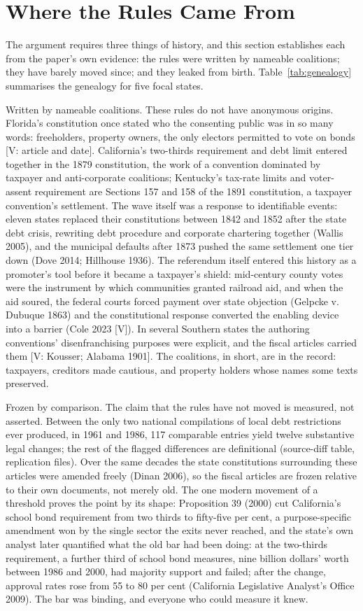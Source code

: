 \section{Where the Rules Came From}
The argument requires three things of history, and this section establishes each from the paper's own evidence: the rules were written by nameable coalitions; they have barely moved since; and they leaked from birth. Table~\ref{tab:genealogy} summarises the genealogy for five focal states.

Written by nameable coalitions. These rules do not have anonymous origins. Florida's constitution once stated who the consenting public was in so many words: freeholders, property owners, the only electors permitted to vote on bonds [V: article and date]. California's two-thirds requirement and debt limit entered together in the 1879 constitution, the work of a convention dominated by taxpayer and anti-corporate coalitions; Kentucky's tax-rate limits and voter-assent requirement are Sections 157 and 158 of the 1891 constitution, a taxpayer convention's settlement. The wave itself was a response to identifiable events: eleven states replaced their constitutions between 1842 and 1852 after the state debt crisis, rewriting debt procedure and corporate chartering together (Wallis 2005), and the municipal defaults after 1873 pushed the same settlement one tier down (Dove 2014; Hillhouse 1936). The referendum itself entered this history as a promoter's tool before it became a taxpayer's shield: mid-century county votes were the instrument by which communities granted railroad aid, and when the aid soured, the federal courts forced payment over state objection (Gelpcke v. Dubuque 1863) and the constitutional response converted the enabling device into a barrier (Cole 2023 [V]). In several Southern states the authoring conventions' disenfranchising purposes were explicit, and the fiscal articles carried them [V: Kousser; Alabama 1901]. The coalitions, in short, are in the record: taxpayers, creditors made cautious, and property holders whose names some texts preserved.

Frozen by comparison. The claim that the rules have not moved is measured, not asserted. Between the only two national compilations of local debt restrictions ever produced, in 1961 and 1986, 117 comparable entries yield twelve substantive legal changes; the rest of the flagged differences are definitional (source-diff table, replication files). Over the same decades the state constitutions surrounding these articles were amended freely (Dinan 2006), so the fiscal articles are frozen relative to their own documents, not merely old. The one modern movement of a threshold proves the point by its shape: Proposition 39 (2000) cut California's school bond requirement from two thirds to fifty-five per cent, a purpose-specific amendment won by the single sector the exits never reached, and the state's own analyst later quantified what the old bar had been doing: at the two-thirds requirement, a further third of school bond measures, nine billion dollars' worth between 1986 and 2000, had majority support and failed; after the change, approval rates rose from 55 to 80 per cent (California Legislative Analyst's Office 2009). The bar was binding, and everyone who could measure it knew.

